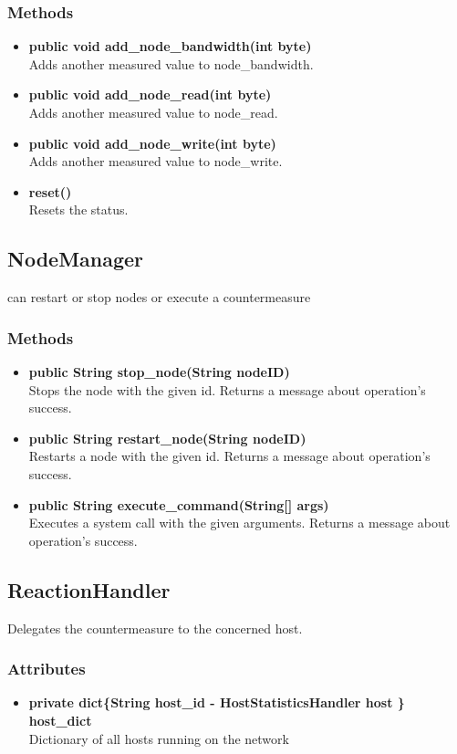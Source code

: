 \subsubsection{Methods}
\begin{itemize}
	\item \textbf{public void add\_node\_bandwidth(int byte)}\\
	Adds another measured value  to node\_bandwidth.
	\item \textbf{public void add\_node\_read(int byte)}\\
	Adds another measured value to node\_read.
	\item \textbf{public void add\_node\_write(int byte)}\\
	Adds another measured value  to node\_write.
	\item \textbf{reset()}\\
	Resets the status.
\end{itemize}

\subsection{NodeManager}
can restart or stop nodes or execute a countermeasure 

\subsubsection{Methods}
\begin{itemize}
	\item \textbf{public String stop\_node(String nodeID)}\\
	Stops the node with the given id.
	Returns a message about operation's success.
	\item \textbf{public String restart\_node(String nodeID)}\\
	Restarts a node with the given id.
	Returns a message about operation's success.
	\item \textbf{public String execute\_command(String[] args)}\\
	Executes a system call with the given arguments.
	Returns a message about operation's success.
\end{itemize}

\subsection{ReactionHandler}
Delegates the countermeasure to the concerned host.

\subsubsection{Attributes}
\begin{itemize}
	\item \textbf{private  dict\{String host\_id  - HostStatisticsHandler host  \} host\_dict}\\
	Dictionary of all hosts running on the network
\end{itemize}

